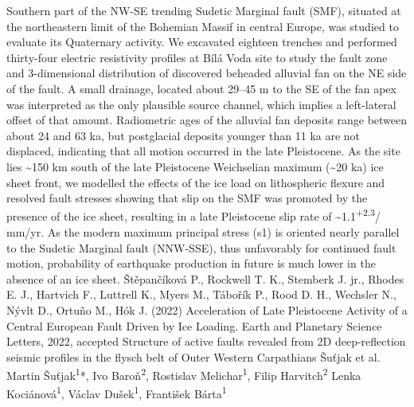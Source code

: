 {Southern part of the NW-SE trending Sudetic Marginal fault (SMF), situated at the northeastern limit of the Bohemian Massif in central Europe, was studied to evaluate its Quaternary activity. We excavated eighteen trenches and performed thirty-four electric resistivity profiles at Bílá Voda site to study the fault zone and 3-dimensional distribution of discovered beheaded alluvial fan on the NE side of the fault.  A small drainage, located about 29--45 m to the SE of the fan apex was interpreted as the only plausible source channel, which implies a left-lateral offset of that amount. Radiometric ages of the alluvial fan deposits range between about 24 and 63 ka, but postglacial deposits younger than 11 ka are not displaced, indicating that all motion occurred in the late Pleistocene. As the site lies \textasciitilde150 km south of the late Pleistocene Weichselian maximum (\textasciitilde20 ka) ice sheet front, we modelled the effects of the ice load on lithospheric flexure and resolved fault stresses showing that slip on the SMF was promoted by the presence of the ice sheet, resulting in a late Pleistocene slip rate of \textasciitilde1.1\textsuperscript{+2.3}/\textsubscript{} mm/yr. As the modern maximum principal stress (s1) is oriented nearly parallel to the Sudetic Marginal fault (NNW-SSE), thus unfavorably for continued fault motion, probability of earthquake production in future is much lower in the absence of an ice sheet.
}
{Štěpančíková P., Rockwell T. K., Stemberk J. jr., Rhodes E. J., Hartvich F., Luttrell K., Myers M., Tábořík P., Rood D. H., Wechsler N., Nývlt D., Ortuño M., Hók J. (2022) Acceleration of Late Pleistocene Activity of a Central European Fault Driven by Ice Loading. Earth and Planetary Science Letters, 2022, accepted 
}
\abstract
{Structure of active faults revealed from 2D deep-reflection seismic profiles in the flysch belt of Outer Western Carpathians} 
{Šuťjak et al.} 
{Martin Šuťjak\textsuperscript{1}*, Ivo Baroň\textsuperscript{2}, Rostislav Melichar\textsuperscript{1}, Filip Harvitch\textsuperscript{2} Lenka Kociánová\textsuperscript{1}, Václav Dušek\textsuperscript{1}, František Bárta\textsuperscript{1}} 
{\TLtag} 
